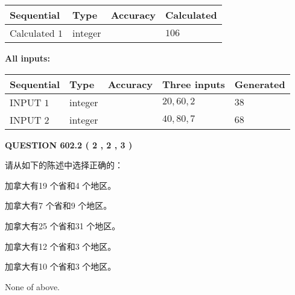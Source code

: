 \documentclass{ctexart}
\begin{document}
   
   
   
\noindent{}
   
   
  
  
\noindent\begin{tabular}{|l|l|l|l|}
\hline
 Sequential & Type & Accuracy & Calculated \\ 
\hline
 
 
  Calculated $  1 $ & integer &  & 
  $ 106 $ 
 \\  \hline  
 \end{tabular}
   
   
   
   
\noindent\vspace{0.1in}\hspace{-0.08in} {\textbf{\Large{All inputs: }}}
   
   
  
  
\noindent\begin{tabular}{|l|l|l|l|l|}
\hline
 Sequential & Type & Accuracy & Three inputs & Generated \\ 
\hline
 
 
  INPUT $  1 $ & integer &  & $
 20
 , 
 60
 , 
 2
 $ & $ 38 $ 
 \\  \hline  
 
 
  INPUT $  2 $ & integer &  & $
 40
 , 
 80
 , 
 7
 $ & $ 68 $ 
 \\  \hline  
 \end{tabular}
   
   
  
\vspace{0.2in}
  
{\textbf{\Large{QUESTION
602.2 
 ( 2 , 2 , 3 )
}}}
  
  
请从如下的陈述中选择正确的：
 
 
加拿大有19 个省和4 个地区。
 
 
加拿大有7 个省和9 个地区。
 
 
加拿大有25 个省和31 个地区。
 
 
加拿大有12 个省和3 个地区。
 
 
加拿大有10 个省和3 个地区。
 
 
 None of above.
 
 
\noindent{}
 
\end{document}
